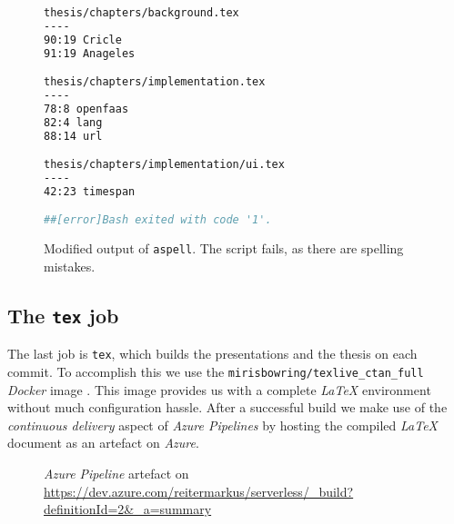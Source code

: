 \begin{figure}[H]
  \centering
  \begin{lstlisting}[language=bash, basicstyle=\footnotesize\ttfamily]
thesis/chapters/background.tex
----
90:19 Cricle
91:19 Anageles

thesis/chapters/implementation.tex
----
78:8 openfaas
82:4 lang
88:14 url

thesis/chapters/implementation/ui.tex
----
42:23 timespan

##[error]Bash exited with code '1'.
  \end{lstlisting}
  \caption{Modified output of \texttt{aspell}. The script fails, as there are spelling mistakes.}
  \label{fig:spellcheck}
\end{figure}

\subsection{The \texttt{tex} job}

The last job is \texttt{tex}, which builds the presentations and the thesis on each
commit. To accomplish this we use the \texttt{mirisbowring/texlive\_ctan\_full} \textit{Docker} image
\cite{tex-hub}. This image provides us with a complete \textit{LaTeX} environment without much
configuration hassle. After a successful build we make use of the \textit{continuous delivery} aspect
of \textit{Azure Pipelines} by hosting the compiled \textit{LaTeX} document as an artefact on
\textit{Azure}.

\begin{figure}[H]
  \centering
  \caption{\textit{Azure Pipeline} artefact on \\
    \url{https://dev.azure.com/reitermarkus/serverless/_build?definitionId=2&_a=summary}}
\end{figure}
